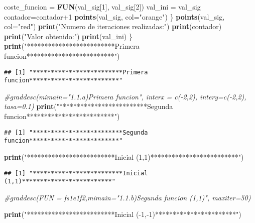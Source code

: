 \documentclass[]{article}
\newenvironment{Shaded}{\begin{snugshade}}{\end{snugshade}}
\newcommand{\KeywordTok}[1]{\textcolor[rgb]{0.13,0.29,0.53}{\textbf{{#1}}}}
\newcommand{\DataTypeTok}[1]{\textcolor[rgb]{0.13,0.29,0.53}{{#1}}}
\newcommand{\DecValTok}[1]{\textcolor[rgb]{0.00,0.00,0.81}{{#1}}}
\newcommand{\StringTok}[1]{\textcolor[rgb]{0.31,0.60,0.02}{{#1}}}
\newcommand{\CommentTok}[1]{\textcolor[rgb]{0.56,0.35,0.01}{\textit{{#1}}}}
\newcommand{\NormalTok}[1]{{#1}}
\begin{document}
\begin{Shaded}
\begin{Highlighting}[]
      \NormalTok{coste_funcion =}\StringTok{ }\KeywordTok{FUN}\NormalTok{(val_sig[}\DecValTok{1}\NormalTok{], val_sig[}\DecValTok{2}\NormalTok{])}
      \NormalTok{val_ini =}\StringTok{ }\NormalTok{val_sig}
      \NormalTok{contador=contador}\DecValTok{+1}
      \KeywordTok{points}\NormalTok{(val_sig, }\DataTypeTok{col=}\StringTok{"orange"}\NormalTok{)}
    \NormalTok{\}}
    \KeywordTok{points}\NormalTok{(val_sig, }\DataTypeTok{col=}\StringTok{"red"}\NormalTok{)}
    \KeywordTok{print}\NormalTok{(}\StringTok{"Numero de iteraciones realizadas:"}\NormalTok{)}
    \KeywordTok{print}\NormalTok{(contador)}
    \KeywordTok{print}\NormalTok{(}\StringTok{"Valor obtenido:"}\NormalTok{)}
    \KeywordTok{print}\NormalTok{(val_ini)}
\NormalTok{\}}
\KeywordTok{print}\NormalTok{(}\StringTok{"*************************Primera funcion*************************"}\NormalTok{)}
\end{Highlighting}
\end{Shaded}

\begin{verbatim}
## [1] "*************************Primera funcion*************************"
\end{verbatim}

\begin{Shaded}
\begin{Highlighting}[]
\CommentTok{#graddesc(mimain="1.1.a)Primera funcion", interx = c(-2,2), intery=c(-2,2), tasa=0.1)}
\KeywordTok{print}\NormalTok{(}\StringTok{"*************************Segunda funcion*************************"}\NormalTok{)}
\end{Highlighting}
\end{Shaded}

\begin{verbatim}
## [1] "*************************Segunda funcion*************************"
\end{verbatim}

\begin{Shaded}
\begin{Highlighting}[]
\KeywordTok{print}\NormalTok{(}\StringTok{"*************************Inicial (1,1)*************************"}\NormalTok{)}
\end{Highlighting}
\end{Shaded}

\begin{verbatim}
## [1] "*************************Inicial (1,1)*************************"
\end{verbatim}

\begin{Shaded}
\begin{Highlighting}[]
\CommentTok{#graddesc(FUN = fs1e1f2,mimain="1.1.b)Segunda funcion (1,1)", maxiter=50)}

\KeywordTok{print}\NormalTok{(}\StringTok{"*************************Inicial (-1,-1)***********************"}\NormalTok{)}
\end{Highlighting}
\end{Shaded}
\end{document}
